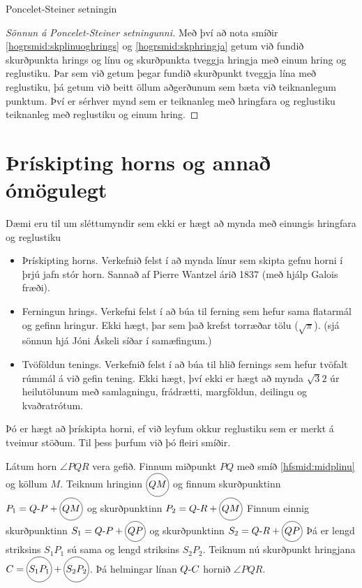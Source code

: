 \begin{frame}{Poncelet-Steiner setningin}
  \begin{proof}[Sönnun á Poncelet-Steiner setningunni]
    Með því að nota smíðir \ref{hogrsmid:skplinuoghrings} og \ref{hogrsmid:skphringja}
    getum við fundið skurðpunkta hrings og línu og skurðpunkta
    tveggja hringja með einum hring og reglustiku. Þar sem við getum þegar
    fundið skurðpunkt tveggja lína með reglustiku, þá getum við  beitt öllum
    aðgerðunum sem bæta við teiknanlegum punktum. Því er sérhver mynd sem er
    teiknanleg með hringfara og reglustiku teiknanleg með reglustiku og einum
    hring.
\end{proof}
\end{frame}

\section{Þrískipting horns og annað ómögulegt} 

\begin{frame}
  Dæmi eru til um sléttumyndir sem ekki er hægt að mynda með einungis hringfara og reglustiku
\begin{itemize}
\item Þrískipting horns. Verkefnið felst í að mynda línur sem skipta gefnu horni í þrjú jafn stór horn. Sannað af Pierre Wantzel árið 1837 (með hjálp Galois fræði).
\item Ferningun hrings. Verkefni felst í að búa til ferning sem hefur sama flatarmál og 
gefinn hringur. Ekki hægt, þar sem það krefst torræðar tölu (\(\sqrt{\pi}\)). (sjá sönnun hjá Jóni Áskeli síðar í samæfingum.)
\item Tvöföldun tenings. Verkefnið felst í að búa til hlið fernings sem hefur tvöfalt rúmmál á við gefin tening. Ekki hægt, því ekki er hægt að mynda \(\sqrt{3}{2}\) úr heilutölunum með
samlagningu, frádrætti, margföldun, deilingu og kvaðratrótum.
\end{itemize}
\end{frame}

\begin{frame}
  Þó er hægt að þrískipta horni, ef við leyfum okkur reglustiku sem er merkt
  á tveimur stöðum. Til þess þurfum við þó fleiri smíðir.
\end{frame}

\begin{frame}
  \begin{smid}
    \label{smid:tviskiptinghorns}
    Látum horn \(\angle PQR\) vera gefið.
    Finnum miðpunkt \(PQ\) með smíð \ref{hfsmid:midplinu}
    og köllum \(M\).
    Teiknum hringinn \(\hri{QM}\) og finnum skurðpunktinn
    \(P_1 = \lin{Q}{P}+\hri{QM}\)  og skurðpunktinn \(P_2 = \lin{Q}{R}+\hri{QM}\)
    Finnum einnig  skurðpunktinn
    \(S_1 = \lin{Q}{P}+\hri{QP}\)  og skurðpunktinn \(S_2 = \lin{Q}{R}+\hri{QP}\)
    Þá er lengd striksins \(S_1P_1\) sú sama og lengd striksins
    \(S_2P_2\).
    Teiknum nú skurðpunkt hringjana
    \(C = \hri{S_1P_1}+\hri{S_2P_2}\).
    Þá helmingar línan \(\lin{Q}{C}\) hornið \(\angle PQR\).
  \end{smid}
\end{frame}

